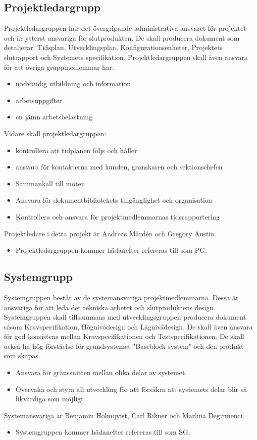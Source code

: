 \documentclass[paper=a4, fontsize=11pt,twoside]{article}
\begin{document}
\subsection*{Projektledargrupp}
Projektledargruppen har det övergripande administrativa ansvaret för projektet och är ytterst ansvariga för slutprodukten. De skall producera dokument som detaljerar: Tidsplan, Utvecklingsplan, Konfigurationsenheter, Projektets slutrapport och Systemets specifikation.
Projektledargruppen skall även ansvara för att övriga gruppmedlemmar har:
\begin{itemize}
\item nödvändig utbildning och  information
\item arbetsuppgifter
\item en jämn arbetsbelastning
\end{itemize}
Vidare skall projektledargruppen:	
\begin{itemize}	 
\item kontrollera att tidplanen följs och håller
\item ansvara för kontakterna med kunden, granskaren och sektionschefen
\item Sammankall till möten
\item Ansvara för dokumentbibliotekets tillgänglighet och organisation
\item Kontrollera och ansvara för projektmedlemmarnas tidsrapportering
\end{itemize}
Projektledare i detta projekt är Andreas Mårdén och Gregory Austin.	
\begin{itemize}
\item Projektledargruppen kommer hädanefter refereras till som PG.
\end{itemize}

\subsection*{Systemgrupp}
Systemgruppen består av de systemansvariga projektmedlemmarna. Dessa är ansvariga för att leda det tekniska arbetet och slutproduktens design. Systemgruppen skall tillsammans med utvecklingsgruppen producera dokument såsom Kravspecifikation, Högnivådesign och Lågnivådesign. De skall även ansvara för god konsistens mellan Kravspecifikationen och Testspecifikationen. De skall också ha hög förståelse för grundsystemet "Baseblock system" och den produkt som skapas.\\
{\color{red}{------Ansvar: (sammanskriv senare detta med resten av texten)}}  %
\begin{itemize}	 
\item Ansvara för gränssnitten mellan olika delar av systemet
\item Övervaka och styra all utveckling för att försäkra att systemets delar blir så likvärdiga som möjligt
\end{itemize}
Systemansvariga är Benjamin Holmqvist, Carl Rikner och Marlina Degirmenci. 
\begin{itemize}
\item Systemgruppen kommer hädanefter refereras till som SG.
\end{itemize}
\end{document}

